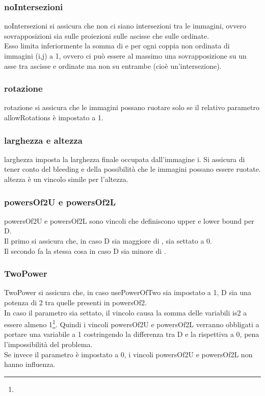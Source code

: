 \subsubsection{noIntersezioni}
noIntersezioni si assicura che non ci siano intersezioni tra le immagini, ovvero sovrapposizioni sia sulle proiezioni sulle ascisse che sulle ordinate. \\
Esso limita inferiormente la somma di \beforeXij{} e \beforeYij{} per ogni coppia non ordinata di immagini (i,j) a 1, ovvero ci può essere al massimo una sovrapposizione su un asse tra ascisse e ordinate ma non su entrambe (cioè un'intersezione).

\begin{sloppypar}
\subsubsection{rotazione}
rotazione si assicura che le immagini possano ruotare solo se il relativo parametro \mbox{allowRotations} è impostato a 1.
\end{sloppypar}





\subsubsection{larghezza e altezza}
larghezza imposta la larghezza finale occupata dall'immagine i. Si assicura di tener conto del bleeding e della possibilità che le immagini possano essere ruotate. \\
altezza è un vincolo simile per l'altezza.


\subsubsection{powersOf2U e powersOf2L}
powersOf2U e powersOf2L sono vincoli che definiscono upper e lower bound per D. \\
Il primo si assicura che, in caso D sia maggiore di \powersOfTp{}, \isTp{} sia settato a 0. \\
Il secondo fa la stessa cosa in caso D sia minore di \powersOfTp. 

\subsubsection{TwoPower}
TwoPower si assicura che, in caso usePowerOfTwo sia impostato a 1, D sia una potenza di 2 tra quelle presenti in powersOf2. \\
In caso il parametro sia settato, il vincolo causa la somma delle variabili is2 a essere almeno 1\footnote{\footIsTSum}.
Quindi i vincoli powersOf2U e powersOf2L verranno obbligati a portare una variabile \isTp{} a 1 costringendo la differenza tra D e la rispettiva \powersOfTp{} a 0, pena l'impossibilità del problema. \\
Se invece il parametro è impostato a 0, i vincoli powersOf2U e powersOf2L non hanno influenza.



\newpage